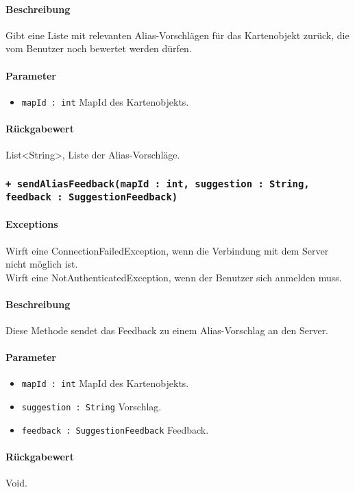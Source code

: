 \paragraph*{Beschreibung}
Gibt eine Liste mit relevanten Alias-Vorschlägen für das Kartenobjekt zurück, 
die vom Benutzer noch bewertet werden dürfen.
\paragraph*{Parameter}
\begin{itemize}
    \item \texttt{mapId : int} MapId des Kartenobjekts.
\end{itemize}
\paragraph*{Rückgabewert}
List<String>, Liste der Alias-Vorschläge.

\subsubsection*{\texttt{+ sendAliasFeedback(mapId : int, suggestion : String, feedback : SuggestionFeedback)}}%
\paragraph*{Exceptions}
Wirft eine ConnectionFailedException, wenn die Verbindung mit dem Server nicht möglich ist.\\
Wirft eine NotAuthenticatedException, wenn der Benutzer sich anmelden muss.
\paragraph*{Beschreibung}
Diese Methode sendet das Feedback zu einem Alias-Vorschlag an den Server.
\paragraph*{Parameter}
\begin{itemize}
    \item \texttt{mapId : int} MapId des Kartenobjekts.
    \item \texttt{suggestion : String} Vorschlag. 
    \item \texttt{feedback : SuggestionFeedback} Feedback.
\end{itemize}
\paragraph*{Rückgabewert}
Void.
